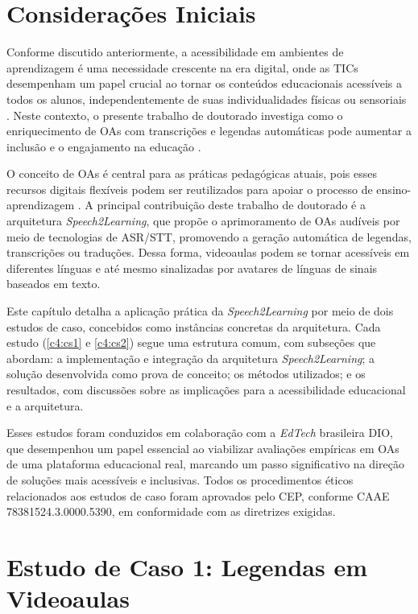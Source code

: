 \section{Considerações Iniciais}

Conforme discutido anteriormente, a acessibilidade em ambientes de aprendizagem é uma necessidade crescente na era digital, onde as TICs desempenham um papel crucial ao tornar os conteúdos educacionais acessíveis a todos os alunos, independentemente de suas individualidades físicas ou sensoriais \cite{Mayer2021}. Neste contexto, o presente trabalho de doutorado investiga como o enriquecimento de OAs com transcrições e legendas automáticas pode aumentar a inclusão e o engajamento na educação \cite{FalvoJr2023_HICSS, FalvoJr2024_FIE}.

O conceito de OAs é central para as práticas pedagógicas atuais, pois esses recursos digitais flexíveis podem ser reutilizados para apoiar o processo de ensino-aprendizagem \cite{Parakh2022}. A principal contribuição deste trabalho de doutorado é a arquitetura \textit{Speech2Learning}, que propõe o aprimoramento de OAs audíveis por meio de tecnologias de ASR/STT, promovendo a geração automática de legendas, transcrições ou traduções. Dessa forma, videoaulas podem se tornar acessíveis em diferentes línguas e até mesmo sinalizadas por avatares de línguas de sinais baseados em texto.

Este capítulo detalha a aplicação prática da \textit{Speech2Learning} por meio de dois estudos de caso, concebidos como instâncias concretas da arquitetura. Cada estudo (\autoref{c4:cs1} e \autoref{c4:cs2}) segue uma estrutura comum, com subseções que abordam: a implementação e integração da arquitetura \textit{Speech2Learning}; a solução desenvolvida como prova de conceito; os métodos utilizados; e os resultados, com discussões sobre as implicações para a acessibilidade educacional e a arquitetura.

Esses estudos foram conduzidos em colaboração com a \textit{EdTech} brasileira DIO, que desempenhou um papel essencial ao viabilizar avaliações empíricas em OAs de uma plataforma educacional real, marcando um passo significativo na direção de soluções mais acessíveis e inclusivas. Todos os procedimentos éticos relacionados aos estudos de caso foram aprovados pelo CEP, conforme CAAE 78381524.3.0000.5390, em conformidade com as diretrizes exigidas.

\section{Estudo de Caso 1: Legendas em Videoaulas}
\label{c4:cs1}

